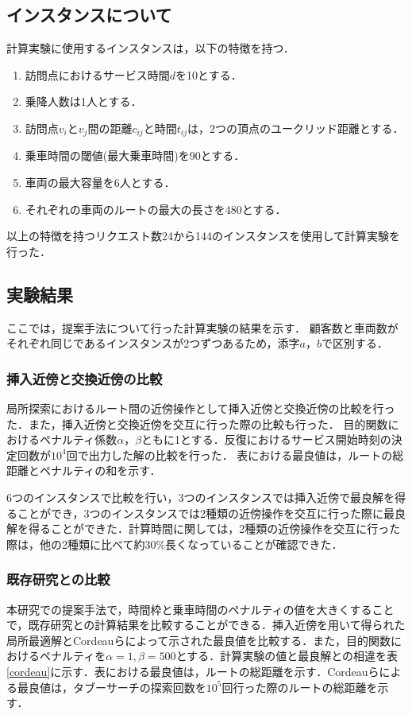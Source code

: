 \documentclass[a4j,11pt,twocolumn]{jsarticle}
\begin{document}
\subsection{インスタンスについて}
計算実験に使用するインスタンスは，以下の特徴を持つ．
\begin{enumerate}
 \item 訪問点におけるサービス時間$d$を10とする．
 \item 乗降人数は1人とする．
 \item 訪問点$v_i$と$v_j$間の距離$c_{ij}$と時間$t_{ij}$は，2つの頂点のユークリッド距離とする．
 \item 乗車時間の閾値(最大乗車時間)を90とする．
 \item 車両の最大容量を6人とする．
 \item それぞれの車両のルートの最大の長さを480とする．
\end{enumerate}
以上の特徴を持つリクエスト数24から144のインスタンスを使用して計算実験を行った．

\subsection{実験結果}
ここでは，提案手法について行った計算実験の結果を示す．
顧客数と車両数がそれぞれ同じであるインスタンスが2つずつあるため，添字$a，b$で区別する．

\subsubsection{挿入近傍と交換近傍の比較}
\label{sec:insert}
局所探索におけるルート間の近傍操作として挿入近傍と交換近傍の比較を行った．また，挿入近傍と交換近傍を交互に行った際の比較も行った．
目的関数におけるペナルティ係数$\alpha$，$\beta$ともに1とする．反復におけるサービス開始時刻の決定回数が$10^4$回で出力した解の比較を行った．
表における最良値は，ルートの総距離とペナルティの和を示す．

6つのインスタンスで比較を行い，3つのインスタンスでは挿入近傍で最良解を得ることができ，3つのインスタンスでは2種類の近傍操作を交互に行った際に最良解を得ることができた．計算時間に関しては，2種類の近傍操作を交互に行った際は，他の2種類に比べて約30\%長くなっていることが確認できた．


\subsubsection{既存研究との比較}
\label{sec:cordeau}
本研究での提案手法で，時間枠と乗車時間のペナルティの値を大きくすることで，既存研究との計算結果を比較することができる．挿入近傍を用いて得られた局所最適解とCordeauらによって示された最良値を比較する．また，目的関数におけるペナルティを$\alpha=1, \beta=500$とする．計算実験の値と最良解との相違を表\ref{cordeau}に示す．表における最良値は，ルートの総距離を示す．Cordeauらによる最良値は，タブーサーチの探索回数を$10^5$回行った際のルートの総距離を示す．
\end{document}
